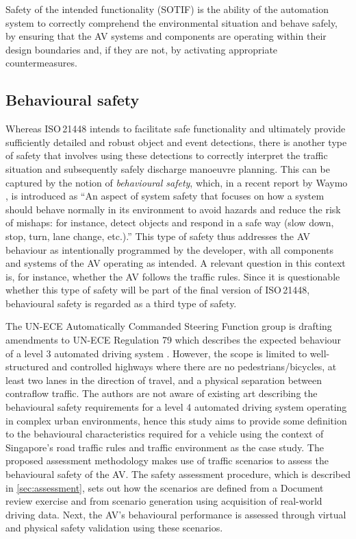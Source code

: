 \begin{definition}
	Safety of the intended functionality (SOTIF) is the ability of the automation system to correctly comprehend the environmental situation and behave safely, by ensuring that the AV systems and components are operating within their design boundaries and, if they are not, by activating appropriate countermeasures.
\end{definition}

\subsection{Behavioural safety}
\label{sec:behavioural safety}


Whereas ISO\,21448 intends to facilitate safe functionality and ultimately provide sufficiently detailed and robust object and event detections, there is another type of safety that involves using these detections to correctly interpret the traffic situation and subsequently safely discharge manoeuvre planning. This can be captured by the notion of \emph{behavioural safety}, which, in a recent report by Waymo \cite{Waymo2017}, is introduced as ``An aspect of system safety that focuses on how a system should behave normally in its environment to avoid hazards and reduce the risk of mishaps: for instance, detect objects and respond in a safe way (slow down, stop, turn, lane change, etc.).'' This type of safety thus addresses the AV behaviour as intentionally programmed by the developer, with all components and systems of the AV operating as intended. A relevant question in this context is, for instance, whether the AV follows the traffic rules. Since it is questionable whether this type of safety will be part of the final version of ISO\,21448, behavioural safety is regarded as a third type of safety.

The UN-ECE Automatically Commanded Steering Function group is drafting amendments to UN-ECE Regulation 79 which describes the expected behaviour of a level 3 automated driving system \cite{sae2018j3016}. However, the scope is limited to well-structured and controlled highways where there are no pedestrians/bicycles, at least two lanes in the direction of travel, and a physical separation between contraflow traffic. The authors are not aware of existing art describing the behavioural safety requirements for a level 4 automated driving system operating in complex urban environments, hence this study aims to provide some definition to the behavioural characteristics required for a vehicle using the context of Singapore's road traffic rules and traffic environment as the case study. The proposed assessment methodology makes use of traffic scenarios to assess the behavioural safety of the AV. The safety assessment procedure, which is described in \cref{sec:assessment}, sets out how the scenarios are defined from a Document review exercise and from scenario generation using acquisition of real-world driving data. Next, the AV's behavioural performance is assessed through virtual and physical safety validation using these scenarios.
